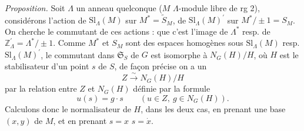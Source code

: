 \documentclass[11pt,a4paper]{article}
\begin{document}
\emph{Proposition.} Soit $\Lambda$ un anneau quelconque ($M$ $\Lambda$-module libre de
rg 2), considérons l'action de $\mathrm{Sl}_\Lambda(M)$ sur $M^{*}=\widetilde{S}_M$, de
$\mathrm{Sl}_\Lambda(M)^{\prime}$ sur $M^{*}/\pm1 = S_M$. On cherche  le commutant de ces actions  :  que c'est l'image de $\Lambda^{*}$ resp. de
$\mathbb{Z}^{\prime}_\Lambda=\Lambda^{*}/\pm1$.
Comme $M^{*}$ et
  $S_M$  sont des espaces homogènes sous  $\mathrm{Sl}_\Lambda(M)$ resp. $\mathrm{Sl}_\Lambda(M)^{\prime}$, le
commutant dans $\mathfrak{S}_S$ de $G$ est isomorphe à $N_G(H)/H$, où $H$ est le
stabilisateur d'un point $s$ de $S$, de façon précise on a un  
\[
Z \xrightarrow{\ \sim\ } N_G(H)/H
\]
par la relation entre $Z$ et $N_G(H)$ définie par la formule
\[
\tag{48}
u(s) = g\cdot s \qquad (u\in Z,\ g\in N_G(H)).
\]
Calculons donc le normalisateur de $H$, dans les deux cas, en prenant une base $(x,y)$ de
$M$, et en prenant $s=x$  $s=\dot x$.
\end{document}
